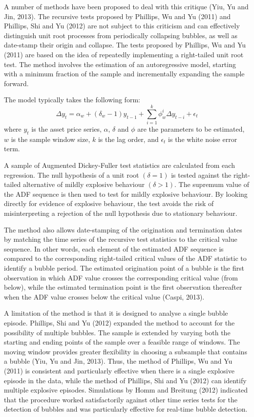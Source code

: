 \documentclass[12pt,]{article}
\begin{document}
A number of methods have been proposed to deal with this critique (Yiu,
Yu and Jin, 2013). The recursive tests proposed by Phillips, Wu and Yu
(2011) and Phillips, Shi and Yu (2012) are not subject to this criticism
and can effectively distinguish unit root processes from periodically
collapsing bubbles, as well as date-stamp their origin and collapse. The
tests proposed by Phillips, Wu and Yu (2011) are based on the idea of
repeatedly implementing a right-tailed unit root test. The method
involves the estimation of an autoregressive model, starting with a
minimum fraction of the sample and incrementally expanding the sample
forward.

The model typically takes the following form:
\[\Delta y_t = \alpha_w + (\delta_w - 1) y_{t-1} + \sum_{i=1}^k \phi_w^i \Delta y_{t-i} + \epsilon_t\]
where \(y_t\) is the asset price series, \(\alpha\), \(\delta\) and
\(\phi\) are the parameters to be estimated, \(w\) is the sample window
size, \(k\) is the lag order, and \(\epsilon_t\) is the white noise
error term.

A sample of Augmented Dickey-Fuller test statistics are calculated from
each regression. The null hypothesis of a unit root \((\delta = 1)\) is
tested against the right-tailed alternative of mildly explosive
behaviour \((\delta > 1)\). The supremum value of the ADF sequence is
then used to test for mildly explosive behaviour. By looking directly
for evidence of explosive behaviour, the test avoids the risk of
misinterpreting a rejection of the null hypothesis due to stationary
behaviour.

The method also allows date-stamping of the origination and termination
dates by matching the time series of the recursive test statistics to
the critical value sequence. In other words, each element of the
estimated ADF sequence is compared to the corresponding right-tailed
critical values of the ADF statistic to identify a bubble period. The
estimated origination point of a bubble is the first observation in
which ADF value crosses the corresponding critical value (from below),
while the estimated termination point is the first observation
thereafter when the ADF value crosses below the critical value (Caspi,
2013).

A limitation of the method is that it is designed to analyse a single
bubble episode. Phillips, Shi and Yu (2012) expanded the method to
account for the possibility of multiple bubbles. The sample is extended
by varying both the starting and ending points of the sample over a
feasible range of windows. The moving window provides greater
flexibility in choosing a subsample that contains a bubble (Yiu, Yu and
Jin, 2013). Thus, the method of Phillips, Wu and Yu (2011) is consistent
and particularly effective when there is a single explosive episode in
the data, while the method of Phillips, Shi and Yu (2012) can identify
multiple explosive episodes. Simulations by Homm and Breitung (2012)
indicated that the procedure worked satisfactorily against other time
series tests for the detection of bubbles and was particularly effective
for real-time bubble detection.
\end{document}
